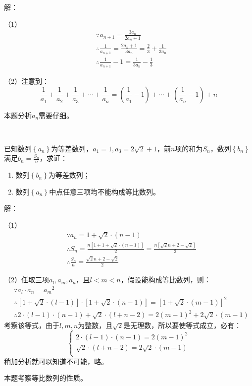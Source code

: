 解：

（1）
\begin{align*}
&\because a_{n+1}=\frac{3a_n}{2a_n+1} \\
&\therefore \frac{1}{a_{n+1}}=\frac{2a_n+1}{3a_n}=\frac{2}{3}+\frac{1}{3a_n} \\
&\therefore \frac{1}{a_{n+1}}-1=\frac{1}{3a_n}-\frac{1}{3}
\end{align*}

（2）注意到：
\[
\frac{1}{a_1}+\frac{1}{a_2}+\frac{1}{a_3}+\cdots +\frac{1}{a_n}=\left( \frac{1}{a_1}-1 \right) +\cdots +\left( \frac{1}{a_n}-1 \right) +n
\]

\begin{tcolorbox}
本题分析$a_n$需要仔细。
\end{tcolorbox}

~

\begin{example}
已知数列$\left\{ a_n \right\} $为等差数列，$a_1=1,a_3=2\sqrt{2}+1$，前$n$项的和为$S_n$，数列$\left\{ b_n \right\} $满足$b_n=\frac{S_n}{n}$，求证：
\begin{enumerate}
    \item 数列$\left\{ b_n \right\} $为等差数列；
    \item 数列$\left\{ a_n \right\} $中点任意三项均不能构成等比数列。
\end{enumerate}
\end{example}

解：

（1）
\begin{align*}
&\because a_n=1+\sqrt{2}\cdot \left( n-1 \right) \\
&\therefore S_n=\frac{n\left[ 1+1+\sqrt{2}\cdot \left( n-1 \right) \right]}{2}=\frac{n\left[ \sqrt{2}n+2-\sqrt{2} \right]}{2} \\
&\therefore \frac{S_n}{n}=\frac{\sqrt{2}n+2-\sqrt{2}}{2}
\end{align*}

（2）任取三项$a_l,a_m,a_n$，且$l<m<n$，假设能构成等比数列，则：
\begin{align*}
&\because a_l\cdot a_n={a_m}^2 \\
&\therefore \left[ 1+\sqrt{2}\cdot \left( l-1 \right) \right] \cdot \left[ 1+\sqrt{2}\cdot \left( n-1 \right) \right] =\left[ 1+\sqrt{2}\cdot \left( m-1 \right) \right] ^2 \\
&\therefore 2\cdot \left( l-1 \right) \cdot \left( n-1 \right) +\sqrt{2}\cdot \left( l+n-2 \right) =2\left( m-1 \right) ^2+2\sqrt{2}\cdot \left( m-1 \right)
\end{align*}
考察该等式，由于$l,m,n$为整数，且$\sqrt{2}$是无理数，所以要使等式成立，必有：
\[
\begin{cases}
	2\cdot \left( l-1 \right) \cdot \left( n-1 \right) =2\left( m-1 \right) ^2\\
	\sqrt{2}\cdot \left( l+n-2 \right) =2\sqrt{2}\cdot \left( m-1 \right)\\
\end{cases}
\]
稍加分析就可以知道不可能，略。

\begin{tcolorbox}
本题考察等比数列的性质。
\end{tcolorbox}




